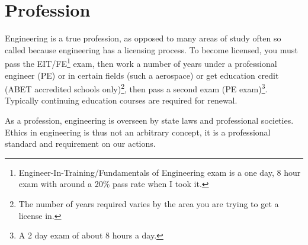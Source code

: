 \section{Profession}

Engineering is a true profession, as opposed to many areas of study often so called because engineering has a licensing process.  To become licensed, you must pass the EIT/FE\footnote{Engineer-In-Training/Fundamentals of Engineering exam is a one day, 8 hour exam with around a 20\% pass rate when I took it.} exam, then work a number of years under a professional engineer (PE) or in certain fields (such a aerospace) or get education credit (ABET accredited schools only)\footnote{The number of years required varies by the area you are trying to get a license in.}, then pass a second exam (PE exam)\footnote{A 2 day exam of about 8 hours a day.}.  Typically continuing education courses are required for renewal.

As a profession, engineering is overseen by state laws and professional societies.  Ethics in engineering is thus not an arbitrary concept, it is a professional standard and requirement on our actions. 